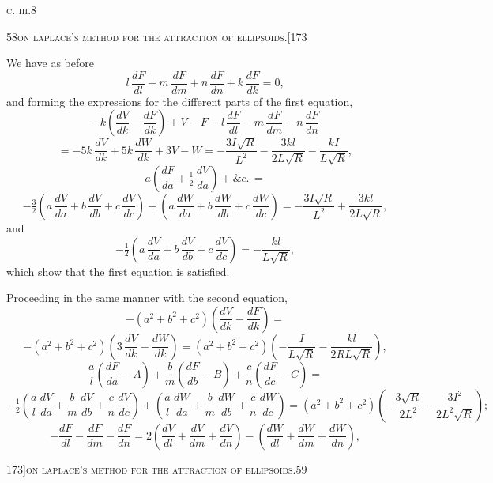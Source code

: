 \documentclass[11pt]{article}
\begin{document}
\bigskip
\hfill\textsc{c. iii.}\hfill 8

\newpage

\begin{center}
\small\textsc{58}\hfill\textsc{on laplace's method for the attraction of ellipsoids.}\hfill[173
\end{center}

\medskip

\noindent We have as before
\[
l\,\frac{dF}{dl} + m\,\frac{dF}{dm} + n\,\frac{dF}{dn} + k\,\frac{dF}{dk} = 0,
\]
and forming the expressions for the different parts of the first equation,
\[
- k\left(\frac{dV}{dk} - \frac{dF}{dk}\right) + V - F - l\,\frac{dF}{dl} - m\,\frac{dF}{dm} - n\,\frac{dF}{dn}
\]
\[
= - 5k\,\frac{dV}{dk} + 5k\,\frac{dW}{dk} + 3V - W = -\frac{3I\sqrt{R}}{L^{2}} - \frac{3kl}{2L\sqrt{R}} - \frac{kI}{L\sqrt{R}},
\]
\[
a\left(\frac{dF}{da} + \tfrac{1}{2}\,\frac{dV}{da}\right) + \&c.\, =
\]
\[
- \tfrac{3}{2}\left(a\,\frac{dV}{da} + b\,\frac{dV}{db} + c\,\frac{dV}{dc}\right) + \left(a\,\frac{dW}{da} + b\,\frac{dW}{db} + c\,\frac{dW}{dc}\right) = -\frac{3I\sqrt{R}}{L^{2}} + \frac{3kl}{2L\sqrt{R}},
\]
and
\[
- \tfrac{1}{2}\left(a\,\frac{dV}{da} + b\,\frac{dV}{db} + c\,\frac{dV}{dc}\right) = -\frac{kl}{L\sqrt{R}},
\]
which show that the first equation is satisfied.

Proceeding in the same manner with the second equation,
\[
- (a^{2} + b^{2} + c^{2})\left(\frac{dV}{dk} - \frac{dF}{dk}\right) =
\]
\[
- (a^{2} + b^{2} + c^{2})\left(3\,\frac{dV}{dk} - \frac{dW}{dk}\right) = (a^{2} + b^{2} + c^{2})\left(-\frac{I}{L\sqrt{R}} - \frac{kl}{2RL\sqrt{R}}\right),
\]
\[
\frac{a}{l}\left(\frac{dF}{da} - A\right) + \frac{b}{m}\left(\frac{dF}{db} - B\right) + \frac{c}{n}\left(\frac{dF}{dc} - C\right) =
\]
\[
- \tfrac{1}{2}\left(\frac{a}{l}\,\frac{dV}{da} + \frac{b}{m}\,\frac{dV}{db} + \frac{c}{n}\,\frac{dV}{dc}\right) + \left(\frac{a}{l}\,\frac{dW}{da} + \frac{b}{m}\,\frac{dW}{db} + \frac{c}{n}\,\frac{dW}{dc}\right) = (a^{2} + b^{2} + c^{2})\left(- \frac{3\sqrt{R}}{2L^{2}} - \frac{3I^{2}}{2L^{2}\sqrt{R}}\right);
\]
\[
- \frac{dF}{dl} - \frac{dF}{dm} - \frac{dF}{dn} = 2\left(\frac{dV}{dl} + \frac{dV}{dm} + \frac{dV}{dn}\right) - \left(\frac{dW}{dl} + \frac{dW}{dm} + \frac{dW}{dn}\right),
\]

\newpage

\begin{center}
\small 173]\hfill\textsc{on laplace's method for the attraction of ellipsoids.}\hfill\textsc{59}
\end{center}
\end{document}
